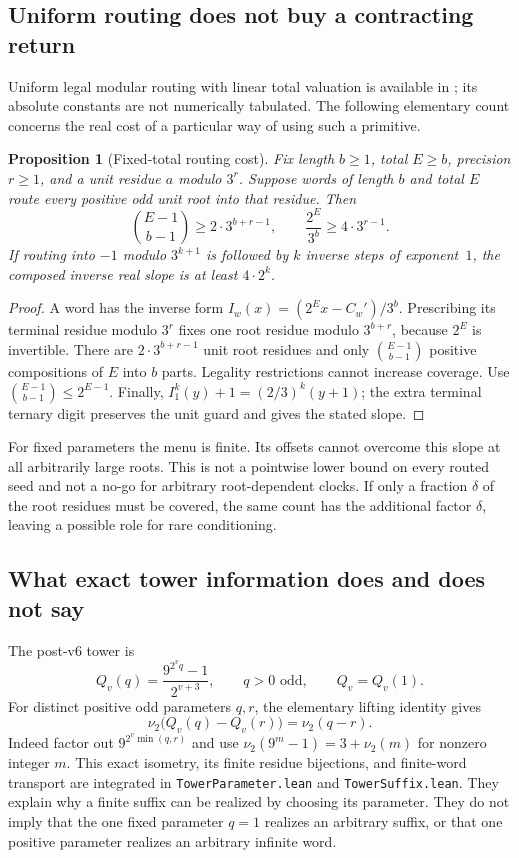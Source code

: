 \documentclass[11pt,a4paper]{article}
\newtheorem{proposition}[theorem]{Proposition}
\theoremstyle{definition}
\begin{document}
\subsection{Uniform routing does not buy a contracting return}
Uniform legal modular routing with linear total valuation is available
in \cite[Theorem~8]{weaver48}; its absolute constants are not numerically tabulated.
The following elementary count concerns the real cost of a particular
way of using such a primitive.
\begin{proposition}[Fixed-total routing cost]\label{prop:routing-cost}
Fix length $b\ge1$, total $E\ge b$, precision $r\ge1$, and a unit
residue $a$ modulo $3^r$. Suppose words of length $b$ and total $E$
route every positive odd unit root into that residue. Then
\[
 \binom{E-1}{b-1}\ge2\cdot3^{b+r-1},\qquad
 \frac{2^E}{3^b}\ge4\cdot3^{r-1}.
\]
If routing into $-1$ modulo $3^{k+1}$ is followed by $k$ inverse
steps of exponent~$1$, the composed inverse real slope is at least
$4\cdot2^k$.
\end{proposition}
\begin{proof}
A word has the inverse form $I_w(x)=(2^Ex-C_w')/3^b$.
Prescribing its terminal residue modulo $3^r$ fixes one root residue
modulo $3^{b+r}$, because $2^E$ is invertible. There are
$2\cdot3^{b+r-1}$ unit root residues and only
$\binom{E-1}{b-1}$ positive compositions of $E$ into $b$ parts.
Legality restrictions cannot increase coverage.
Use $\binom{E-1}{b-1}\le2^{E-1}$. Finally,
$I_1^k(y)+1=(2/3)^k(y+1)$; the extra terminal ternary digit
preserves the unit guard and gives the stated slope.
\end{proof}
For fixed parameters the menu is finite. Its offsets cannot overcome
this slope at all arbitrarily large roots. This is not a pointwise
lower bound on every routed seed and not a no-go for arbitrary
root-dependent clocks. If only a fraction $\delta$ of the root
residues must be covered, the same count has the additional factor
$\delta$, leaving a possible role for rare conditioning.

\subsection{What exact tower information does and does not say}
The post-v6 tower is
\[
 Q_v(q)=\frac{9^{2^v q}-1}{2^{v+3}},\qquad q>0\text{ odd},
 \qquad Q_v=Q_v(1).
\]
For distinct positive odd parameters $q,r$, the elementary lifting
identity gives
\[
 \nu_2\bigl(Q_v(q)-Q_v(r)\bigr)=\nu_2(q-r).
\]
Indeed factor out $9^{2^v\min(q,r)}$ and use
$\nu_2(9^m-1)=3+\nu_2(m)$ for nonzero integer $m$.
This exact isometry, its finite residue bijections, and finite-word
transport are integrated in \texttt{TowerParameter.lean} and
\texttt{TowerSuffix.lean}. They explain why a finite suffix can be
realized by choosing its parameter. They do not imply that the one
fixed parameter $q=1$ realizes an arbitrary suffix, or that one
positive parameter realizes an arbitrary infinite word.
\end{document}
